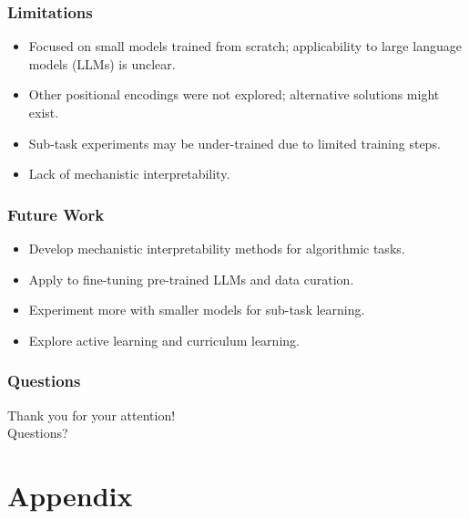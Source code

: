 \documentclass[14pt,aspectratio=169]{beamer}
\theoremstyle{remark}
\begin{document}
\begin{frame}
    \frametitle{Limitations}
    \begin{itemize}
        \item Focused on small models trained from scratch; applicability to large language models (LLMs) is unclear.
        \item Other positional encodings were not explored; alternative solutions might exist.
        \item Sub-task experiments may be under-trained due to limited training steps.
        \item Lack of mechanistic interpretability.
    \end{itemize}
\end{frame}

\begin{frame}
    \frametitle{Future Work}
    \begin{itemize}
        \item Develop mechanistic interpretability methods for algorithmic tasks.
        \item Apply to fine-tuning pre-trained LLMs and data curation.
        \item Experiment more with smaller models for sub-task learning.
        \item Explore active learning and curriculum learning.
    \end{itemize}
\end{frame}

\begin{frame}
    \frametitle{Questions}
    \centering
    Thank you for your attention! \\
    \vspace{1cm}
    Questions?
\end{frame}





\section{Appendix}
\end{document}
